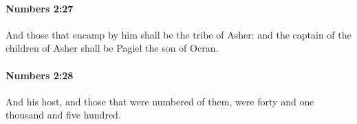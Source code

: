 		\paragraph{Numbers 2:27} %
			\label{NUMBERS-2-27}

			And those that encamp by him shall be the tribe of Asher: and the captain of the children of Asher shall be Pagiel the son of Ocran.


		\paragraph{Numbers 2:28} %
			\label{NUMBERS-2-28}

			And his host, and those that were numbered of them, were forty and one thousand and five hundred.



